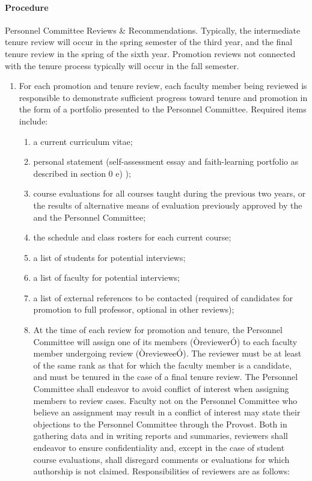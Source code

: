 \documentclass[letterpaper, 11pt]{article}
\begin{document}
			\paragraph{Procedure}
				Personnel Committee Reviews \& Recommendations.  Typically, the intermediate tenure review will occur in the spring semester of the third year, and the final tenure review in the spring of the sixth year.  Promotion reviews not connected with the tenure process typically will occur in the fall semester.
				\begin{enumerate}[label=\alph*)]
					\item{For each promotion and tenure review, each faculty member being reviewed is responsible to demonstrate sufficient progress toward tenure and promotion in the form of a portfolio presented to the Personnel Committee. Required items include:
						\begin{enumerate}[label=\arabic*)]
							\item{a current curriculum vitae;}
							\item{personal statement (self-assessment essay and faith-learning portfolio as described in section 0 e) );}
							\item{course evaluations for all courses taught during the previous two years, or the results of alternative means of evaluation previously approved by the and the Personnel Committee;}
							\item{the schedule and class rosters for each current course;}
							\item{a list of students for potential interviews;}
							\item{a list of faculty for potential interviews;}
							\item{a list of external references to be contacted (required of candidates for promotion to full professor, optional in other reviews);}
							\item{At the time of each review for promotion and tenure, the Personnel Committee will assign one of its members (ÒreviewerÓ) to each faculty member undergoing review (ÒrevieweeÓ).  The reviewer must be at least of the same rank as that for which the faculty member is a candidate, and must be tenured in the case of a final tenure review.  The Personnel Committee shall endeavor to avoid conflict of interest when assigning members to review cases.  Faculty not on the Personnel Committee who believe an assignment may result in a conflict of interest may state their objections to the Personnel Committee through the Provost.  Both in gathering data and in writing reports and summaries, reviewers shall endeavor to ensure confidentiality and, except in the case of student course evaluations, shall disregard comments or evaluations for which authorship is not claimed.  Responsibilities of reviewers are as follows:}
						\end{enumerate}
					}
				\end{enumerate}
\end{document}
